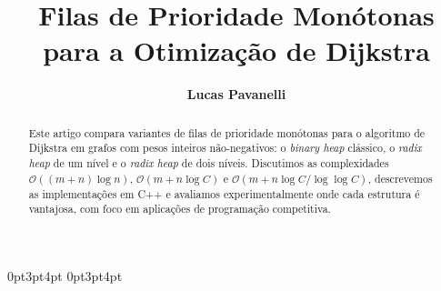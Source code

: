 \documentclass[10pt]{extarticle}
\title{Filas de Prioridade Monótonas para a Otimização de Dijkstra}
\author{\color{cyan!50!black}\bfseries Lucas Pavanelli %
}
\date{\vspace{-1.0cm}}
\begin{document}
\titlespacing*{\section}
{0pt}{3pt}{4pt}
\titlespacing*{\subsection}
{0pt}{3pt}{4pt}

\maketitle

\begin{abstract}
Este artigo compara variantes de filas de prioridade monótonas para o
algoritmo de Dijkstra em grafos com pesos inteiros não-negativos: o
\textit{binary heap} clássico, o \textit{radix heap} de um nível e o
\textit{radix heap} de dois níveis. Discutimos as complexidades
$\mathcal{O}((m+n)\log n)$, $\mathcal{O}(m + n\log C)$ e
$\mathcal{O}(m + n\log C / \log\log C)$, descrevemos as implementações em C++
e avaliamos experimentalmente onde cada estrutura é vantajosa, com foco em
aplicações de programação competitiva.
\end{abstract}





\end{document}

